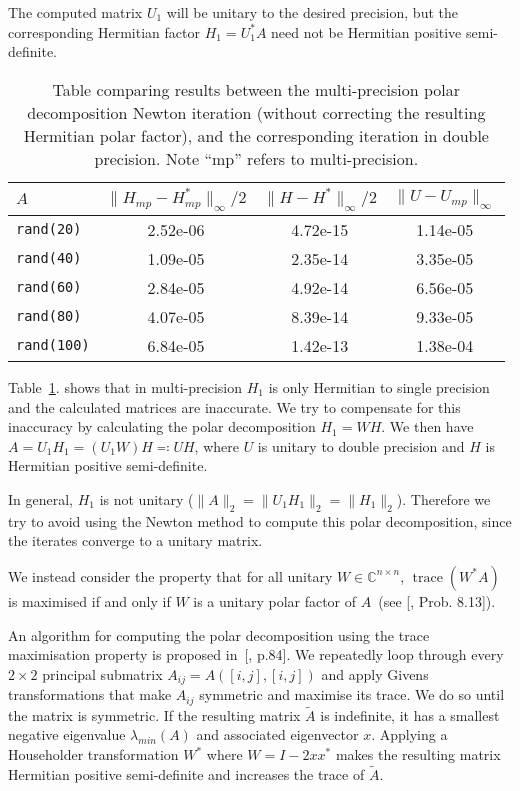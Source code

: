 \documentclass[10pt, A4paper]{article}
\newcommand{\nxn}{n \times n}
\DeclareMathOperator{\trace}{trace}
\begin{document}
The computed matrix $U_1$ will be unitary to the desired precision, but
the corresponding Hermitian factor $H_1 = U_1^*A$ need not be Hermitian
positive semi-definite.
\begin{table}
	\centering
	\begin{tabular}{lccc}
		\toprule
		$A$   & $\|H_{mp} - H^*_{mp}\|_\infty / 2$ & $\|H - H^*\|_\infty / 2$
		& $\|U - U_{mp}\|_\infty$ \\
		\midrule
		\texttt{rand(20)}  & 2.52e-06         & 4.72e-15         & 1.14e-05 \\
		\texttt{rand(40)}  & 1.09e-05         & 2.35e-14         & 3.35e-05 \\
		\texttt{rand(60)}  & 2.84e-05         & 4.92e-14         & 6.56e-05 \\
		\texttt{rand(80)}  & 4.07e-05         & 8.39e-14         & 9.33e-05 \\
		\texttt{rand(100)} & 6.84e-05         & 1.42e-13         & 1.38e-04 \\
		\bottomrule
	\end{tabular}
	\caption{
		\label{tab:multiPoldec}
		Table comparing results between the multi-precision polar 
		decomposition Newton iteration (without correcting the 
		resulting Hermitian polar factor), and the corresponding 
		iteration in double precision. Note ``mp'' refers to 
		multi-precision.
	}
\end{table}
Table~\ref{tab:multiPoldec}. shows that in multi-precision $H_1$ is 
only Hermitian to 
single precision and the calculated matrices are inaccurate.
We try to compensate for this inaccuracy by calculating the polar
decomposition $H_1 = WH$. We then have $A = U_1H_1 = (U_1W)H \eqqcolon
UH$, where $U$ is unitary to double precision and $H$ is Hermitian
positive semi-definite.

In general, $H_1$ is not unitary ($\|A\|_2 = \|U_1H_1\|_2 =
\|H_1\|_2$). Therefore we try to avoid using the Newton method to
compute this polar decomposition, since the iterates converge to a
unitary matrix.

We instead consider the property that for all unitary
$W \in \mathbb{C}^{\nxn}$, $\trace(W^*A)$ is maximised if and only if
$W$ is a unitary polar factor of $A$~{(see [\citealp{high2008}, Prob.
8.13])}.

An algorithm for computing the polar decomposition using the trace 
maximisation property is proposed in~{[\citealp{smit2002}, p.84]}.
We repeatedly loop through every $2\times 2$ principal submatrix 
$A_{ij} =A([i,j], [i,j])$ and apply Givens transformations that make 
$A_{ij}$ symmetric and maximise its trace.
We do so until the matrix is symmetric.
If the resulting matrix $\tilde{A}$ is indefinite, it has a smallest 
negative eigenvalue $\lambda_{min}(A)$ and associated eigenvector $x$. 
Applying a Householder transformation $W^*$ where $W = I - 2xx^*$ makes 
the resulting matrix Hermitian positive semi-definite and
increases the trace of $\tilde{A}$.
\end{document}
